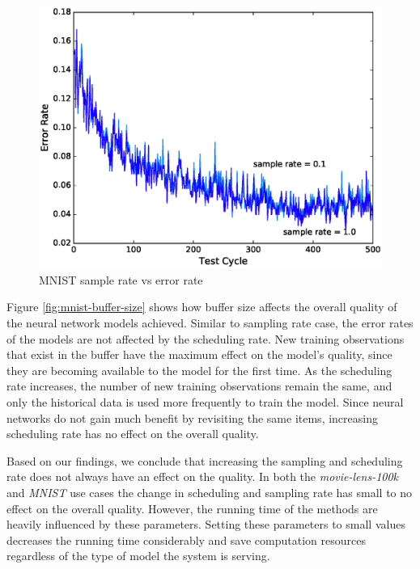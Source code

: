 \documentclass{sig-alternate-05-2015}
\begin{document}
\begin{figure}[!ht]
\centering
\includegraphics[width=\columnwidth]{../images/experiment-results/mnist-sampling.eps}
\caption{MNIST sample rate vs error rate}
\label{fig:mnist-sample-rate}
\end{figure}

Figure \ref{fig:mnist-buffer-size} shows how buffer size affects the overall quality of the neural network models achieved.
Similar to sampling rate case, the error rates of the models are not affected by the scheduling rate.
New training observations that exist in the buffer have the maximum effect on the model's quality, since they are becoming available to the model for the first time.
As the scheduling rate increases, the number of new training observations remain the same, and only the historical data is used more frequently to train the model.
Since neural networks do not gain much benefit by revisiting the same items, increasing scheduling rate has no effect on the overall quality.

Based on our findings, we conclude that increasing the sampling and scheduling rate does not always have an effect on the quality.
In both the \textit{movie-lens-100k} and \textit{MNIST} use cases the change in scheduling and sampling rate has small to no effect on the overall quality.
However, the running time of the methods are heavily influenced by these parameters.
Setting these parameters to small values decreases the running time considerably and save computation resources regardless of the type of model the system is serving.
\end{document}
